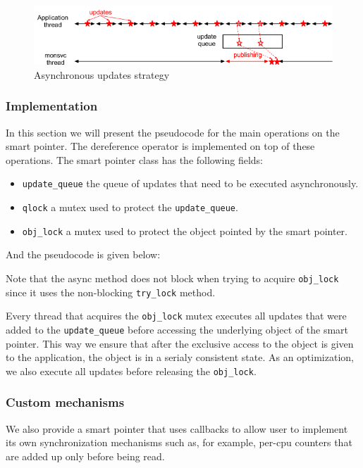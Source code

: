 \begin{figure}[ht!]
\centering
\includegraphics[scale=0.6]{Images/async_after.png}
\caption{Asynchronous updates strategy}
\end{figure}

\subsubsection*{Implementation}

In this section we will present the pseudocode for the main operations on the smart pointer. The dereference operator is implemented on top of these operations. The smart pointer class has the following fields:
\begin{itemize}
\item {\tt update\_queue} the queue of updates that need to be executed asynchronously.
\item {\tt qlock} a mutex used to protect the {\tt update\_queue}.
\item {\tt obj\_lock} a mutex used to protect the object pointed by the smart pointer.
\end{itemize}
And the pseudocode is given below:

Note that the async method does not block when trying to acquire {\tt obj\_lock} since it uses the non-blocking {\tt try\_lock} method. 

Every thread that acquires the {\tt obj\_lock} mutex executes all updates that were added to the {\tt update\_queue} before accessing the underlying object of the smart pointer. This way we ensure that after the exclusive access to the object is given to the application, the object is in a serialy consistent state. As an optimization, we also execute all updates before releasing the {\tt obj\_lock}.

\subsubsection*{Custom mechanisms}

We also provide a smart pointer that uses callbacks to allow user to implement its own synchronization mechanisms such as, for example, per-cpu counters that are added up only before being read.
